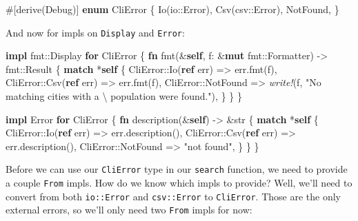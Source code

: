 \documentclass[a4paper,]{book}
\newenvironment{Shaded}{\begin{snugshade}}{\end{snugshade}}
\newcommand{\KeywordTok}[1]{\textcolor[rgb]{0.13,0.29,0.53}{\textbf{{#1}}}}
\newcommand{\DataTypeTok}[1]{\textcolor[rgb]{0.13,0.29,0.53}{{#1}}}
\newcommand{\SpecialCharTok}[1]{\textcolor[rgb]{0.00,0.00,0.00}{{#1}}}
\newcommand{\StringTok}[1]{\textcolor[rgb]{0.31,0.60,0.02}{{#1}}}
\newcommand{\BuiltInTok}[1]{{#1}}
\newcommand{\PreprocessorTok}[1]{\textcolor[rgb]{0.56,0.35,0.01}{\textit{{#1}}}}
\newcommand{\AttributeTok}[1]{\textcolor[rgb]{0.77,0.63,0.00}{{#1}}}
\newcommand{\NormalTok}[1]{{#1}}
\begin{document}
\begin{Shaded}
\begin{Highlighting}[]
\AttributeTok{#[}\NormalTok{derive}\AttributeTok{(}\BuiltInTok{Debug}\AttributeTok{)]}
\KeywordTok{enum} \NormalTok{CliError \{}
    \NormalTok{Io(io::Error),}
    \NormalTok{Csv(csv::Error),}
    \NormalTok{NotFound,}
\NormalTok{\}}
\end{Highlighting}
\end{Shaded}

And now for impls on \texttt{Display} and \texttt{Error}:

\begin{Shaded}
\begin{Highlighting}[]
\KeywordTok{impl} \NormalTok{fmt::}\BuiltInTok{Display} \KeywordTok{for} \NormalTok{CliError \{}
    \KeywordTok{fn} \NormalTok{fmt(&}\KeywordTok{self}\NormalTok{, f: &}\KeywordTok{mut} \NormalTok{fmt::Formatter) -> fmt::}\DataTypeTok{Result} \NormalTok{\{}
        \KeywordTok{match} \NormalTok{*}\KeywordTok{self} \NormalTok{\{}
            \NormalTok{CliError::Io(}\KeywordTok{ref} \NormalTok{err) => err.fmt(f),}
            \NormalTok{CliError::Csv(}\KeywordTok{ref} \NormalTok{err) => err.fmt(f),}
            \NormalTok{CliError::NotFound => }\PreprocessorTok{write!}\NormalTok{(f, }\StringTok{"No matching cities with a }\SpecialCharTok{\textbackslash{}}
\StringTok{                                             population were found."}\NormalTok{),}
        \NormalTok{\}}
    \NormalTok{\}}
\NormalTok{\}}

\KeywordTok{impl} \NormalTok{Error }\KeywordTok{for} \NormalTok{CliError \{}
    \KeywordTok{fn} \NormalTok{description(&}\KeywordTok{self}\NormalTok{) -> &}\DataTypeTok{str} \NormalTok{\{}
        \KeywordTok{match} \NormalTok{*}\KeywordTok{self} \NormalTok{\{}
            \NormalTok{CliError::Io(}\KeywordTok{ref} \NormalTok{err) => err.description(),}
            \NormalTok{CliError::Csv(}\KeywordTok{ref} \NormalTok{err) => err.description(),}
            \NormalTok{CliError::NotFound => }\StringTok{"not found"}\NormalTok{,}
        \NormalTok{\}}
    \NormalTok{\}}
\NormalTok{\}}
\end{Highlighting}
\end{Shaded}

Before we can use our \texttt{CliError} type in our \texttt{search}
function, we need to provide a couple \texttt{From} impls. How do we
know which impls to provide? Well, we'll need to convert from both
\texttt{io::Error} and \texttt{csv::Error} to \texttt{CliError}. Those
are the only external errors, so we'll only need two \texttt{From} impls
for now:
\end{document}
